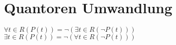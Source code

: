 \section{Quantoren Umwandlung}
$\forall t\in R(P(t)) = \neg(\exists t \in R(\neg P(t)))$\\
$\exists t\in R(P(t)) = \neg(\forall t \in R(\neg P(t)))$